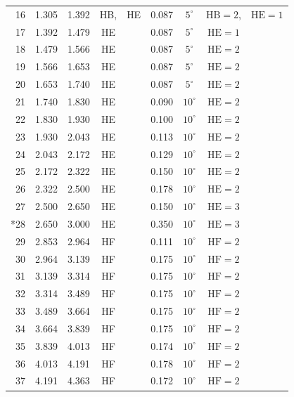 \begin{table}
\begin{tabular}{r|c|c|cc|c|c|cc}
    16 & 1.305 & 1.392 & HB, & HE & 0.087 & $5^{\circ}$  & $\text{HB} = 2$, & $\text{HE} = 1$ \\
    17 & 1.392 & 1.479 & HE  &    & 0.087 & $5^{\circ}$  & $\text{HE} = 1$  & \\
    18 & 1.479 & 1.566 & HE  &    & 0.087 & $5^{\circ}$  & $\text{HE} = 2$  & \\
    19 & 1.566 & 1.653 & HE  &    & 0.087 & $5^{\circ}$  & $\text{HE} = 2$  & \\
    20 & 1.653 & 1.740 & HE  &    & 0.087 & $5^{\circ}$  & $\text{HE} = 2$  & \\
    21 & 1.740 & 1.830 & HE  &    & 0.090 & $10^{\circ}$ & $\text{HE} = 2$  & \\
    22 & 1.830 & 1.930 & HE  &    & 0.100 & $10^{\circ}$ & $\text{HE} = 2$  & \\
    23 & 1.930 & 2.043 & HE  &    & 0.113 & $10^{\circ}$ & $\text{HE} = 2$  & \\
    24 & 2.043 & 2.172 & HE  &    & 0.129 & $10^{\circ}$ & $\text{HE} = 2$  & \\
    25 & 2.172 & 2.322 & HE  &    & 0.150 & $10^{\circ}$ & $\text{HE} = 2$  & \\
    26 & 2.322 & 2.500 & HE  &    & 0.178 & $10^{\circ}$ & $\text{HE} = 2$  & \\
    27 & 2.500 & 2.650 & HE  &    & 0.150 & $10^{\circ}$ & $\text{HE} = 3$  & \\
   *28 & 2.650 & 3.000 & HE  &    & 0.350 & $10^{\circ}$ & $\text{HE} = 3$  & \\
    29 & 2.853 & 2.964 & HF  &    & 0.111 & $10^{\circ}$ & $\text{HF} = 2$  & \\
    30 & 2.964 & 3.139 & HF  &    & 0.175 & $10^{\circ}$ & $\text{HF} = 2$  & \\
    31 & 3.139 & 3.314 & HF  &    & 0.175 & $10^{\circ}$ & $\text{HF} = 2$  & \\
    32 & 3.314 & 3.489 & HF  &    & 0.175 & $10^{\circ}$ & $\text{HF} = 2$  & \\
    33 & 3.489 & 3.664 & HF  &    & 0.175 & $10^{\circ}$ & $\text{HF} = 2$  & \\
    34 & 3.664 & 3.839 & HF  &    & 0.175 & $10^{\circ}$ & $\text{HF} = 2$  & \\
    35 & 3.839 & 4.013 & HF  &    & 0.174 & $10^{\circ}$ & $\text{HF} = 2$  & \\
    36 & 4.013 & 4.191 & HF  &    & 0.178 & $10^{\circ}$ & $\text{HF} = 2$  & \\
    37 & 4.191 & 4.363 & HF  &    & 0.172 & $10^{\circ}$ & $\text{HF} = 2$  & \\

\end{tabular}
\end{table}
